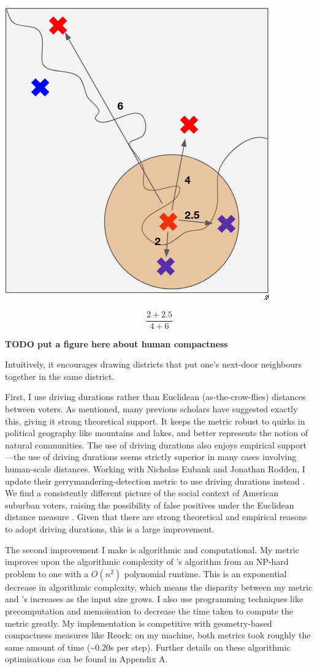 \documentclass[]{article}
\begin{document}
\includegraphics{img/human_compactness.png}

\[ \frac{2 + 2.5}{4+6}\]

\textbf{TODO put a figure here about human compactness}

Intuitively, it encourages drawing districts that put one's next-door
neighbours together in the same district.

First, I use driving durations rather than Euclidean (as-the-crow-flies)
distances between voters. As mentioned, many previous scholars have
suggested exactly this, giving it strong theoretical support. It keeps
the metric robust to quirks in political geography like mountains and
lakes, and better represents the notion of natural communities. The use
of driving durations also enjoys empirical support---the use of driving
durations seems strictly superior in many cases involving human-scale
distances. Working with Nicholas Eubank and Jonathan Rodden, I update
their gerrymandering-detection metric to use driving durations instead
\citep{er2019}. We find a consistently different picture of the social
context of American suburban voters, raising the possibility of false
positives under the Euclidean distance measure \citep*{elrwp}. Given
that there are strong theoretical and empirical reasons to adopt driving
durations, this is a large improvement.

The second improvement I make is algorithmic and computational. My
metric improves upon the algorithmic complexity of \citeauthor{fh2011}'s
algorithm from an NP-hard problem to one with a \(O(n^2)\) polynomial
runtime. This is an exponential decrease in algorithmic complexity,
which means the disparity between my metric and \citeauthor{fh2011}'s
increases as the input size grows. I also use programming techniques
like precomputation and memoisation to decrease the time taken to
compute the metric greatly. My implementation is competitive with
geometry-based compactness measures like Reock: on my machine, both
metrics took roughly the same amount of time (\textasciitilde{}0.20s per
step). Further details on these algorithmic optimisations can be found
in Appendix A.
\end{document}
